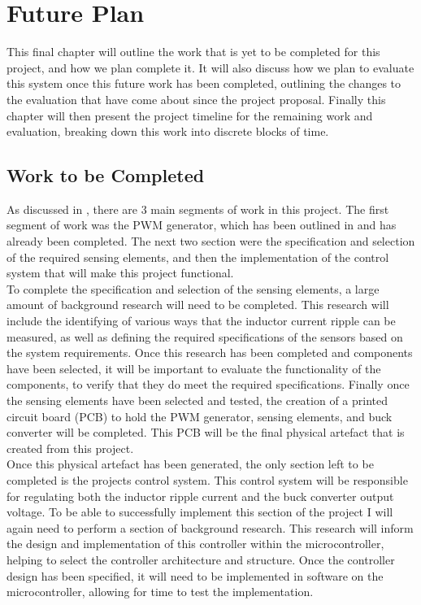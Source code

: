 \chapter{Future Plan}\label{C:future} 

This final chapter will outline the work that is yet to be completed for this project, and how we plan complete it. It will also discuss how we plan to evaluate this system once this future work has been completed, outlining the changes to the evaluation that have come about since the project proposal. Finally this chapter will then present the project timeline for the remaining work and evaluation, breaking down this work into discrete blocks of time. 

\section{Work to be Completed}\label{S:work_remaining}

As discussed in , there are 3 main segments of work in this project. The first segment of work was the PWM generator, which has been outlined in  and has already been completed. The next two section were the specification and selection of the required sensing elements, and then the implementation of the control system that will make this project functional.\\

To complete the specification and selection of the sensing elements, a large amount of background research will need to be completed. This research will include the identifying of various ways that the inductor current ripple can be measured, as well as defining the required specifications of the sensors based on the system requirements. Once this research has been completed and components have been selected, it will be important to evaluate the functionality of the components, to verify that they do meet the required specifications. Finally once the sensing elements have been selected and tested, the creation of a printed circuit board (PCB) to hold the PWM generator, sensing elements, and buck converter will be completed. This PCB will be the final physical artefact that is created from this project. \\

Once this physical artefact has been generated, the only section left to be completed is the projects control system. This control system will be responsible for regulating both the inductor ripple current and the buck converter output voltage. To be able to successfully implement this section of the project I will again need to perform a section of background research. This research will inform the design and implementation of this controller within the microcontroller, helping to select the controller architecture and structure. Once the controller design has been specified, it will need to be implemented in software on the microcontroller, allowing for time to test the implementation. 

